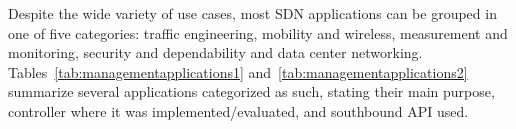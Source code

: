 %

Despite the wide variety of use cases, most SDN applications can be grouped in one of five categories: traffic engineering, mobility and wireless, measurement and monitoring, security and dependability and data center networking.
Tables~\ref{tab:managementapplications1} and~\ref{tab:managementapplications2} summarize several applications categorized as such, stating their main purpose, controller where it was implemented/evaluated, and southbound API used.

